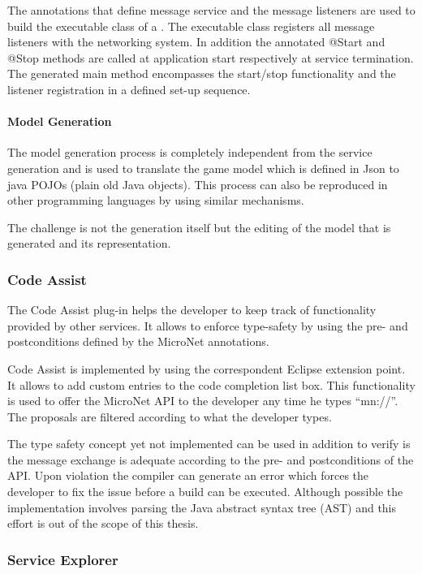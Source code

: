 The annotations that define message service and the message listeners are used
to build the executable class of a \ms{}. The executable class registers all
message listeners with the networking system. In addition the annotated @Start
and @Stop methods are called at application start respectively at service
termination. The generated main method encompasses the start/stop functionality
and the listener registration in a defined set-up sequence.

\paragraph{Model Generation}

The model generation process is completely independent from the service
generation and is used to translate the game model which is defined in Json to
java POJOs (plain old Java objects). This process can also be reproduced in
other programming languages by using similar mechanisms. 

The challenge is not the generation itself but the editing of the model that is
generated and its representation. 

\subsubsection{Code Assist}

The Code Assist plug-in helps the developer to keep track of functionality
provided by other services. It allows to enforce type-safety by using the pre-
and postconditions defined by the MicroNet annotations.

Code Assist is implemented by using the correspondent Eclipse extension point.
It allows to add custom entries to the code completion list box. This
functionality is used to offer the MicroNet API to the developer any time he
types ``mn://''. The proposals are filtered according to what the developer
types.

The type safety concept yet not implemented can be used in addition to verify is
the message exchange is adequate according to the pre- and postconditions of the
API. Upon violation the compiler can generate an error which forces the
developer to fix the issue before a build can be executed. Although possible the
implementation involves parsing the Java abstract syntax tree (AST) and this
effort is out of the scope of this thesis.

\subsubsection{Service Explorer}

